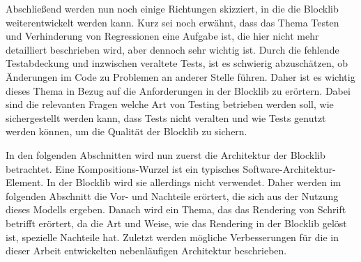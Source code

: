 Abschließend werden nun noch einige Richtungen skizziert, in die die Blocklib weiterentwickelt werden kann. Kurz sei noch erwähnt, dass das Thema Testen und Verhinderung von Regressionen eine Aufgabe ist, die hier nicht mehr detailliert beschrieben wird, aber dennoch sehr wichtig ist. Durch die fehlende Testabdeckung und inzwischen veraltete Tests, ist es schwierig abzuschätzen, ob Änderungen im Code zu Problemen an anderer Stelle führen. Daher ist es wichtig dieses Thema in Bezug auf die Anforderungen in der Blocklib zu erörtern. Dabei sind die relevanten Fragen welche Art von Testing betrieben werden soll, wie sichergestellt werden kann, dass Tests nicht veralten und wie Tests genutzt werden können, um die Qualität der Blocklib zu sichern.

In den folgenden Abschnitten wird nun zuerst die Architektur der Blocklib betrachtet. Eine Kompositions-Wurzel ist ein typisches Software-Architektur-Element. In der Blocklib wird sie allerdings nicht verwendet. Daher werden im folgenden Abschnitt die Vor- und Nachteile erörtert, die sich aus der Nutzung dieses Modells ergeben. Danach wird ein Thema, das das Rendering von Schrift betrifft erörtert, da die Art und Weise, wie das Rendering in der Blocklib gelöst ist, spezielle Nachteile hat. Zuletzt werden mögliche Verbesserungen für die in dieser Arbeit entwickelten nebenläufigen Architektur beschrieben.